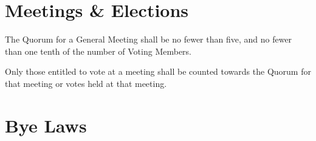 \documentclass[10pt]{mk-articles-of-association}
\begin{document}


\section{Meetings \& Elections}

\begin{constenum}

  \item The Quorum for a General Meeting shall be no fewer than five, and
    no fewer than one tenth of the number of Voting Members.\label{quorum}

  \item Only those entitled to vote at a meeting shall be counted towards
    the Quorum for that meeting or votes held at that meeting.

\end{constenum}



\section{Bye Laws}
\end{document}
